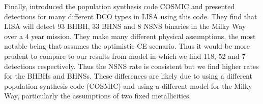 Finally, \citet{Breivik+2020} introduced the population synthesis code COSMIC and presented detections for many different DCO types in LISA using this code. They find that LISA will detect 93 BHBH, 33 BHNS and 8 NSNS binaries in the Milky Way over a 4 year mission. They make many different physical assumptions, the most notable being that \citet{Breivik+2020} assumes the optimistic CE scenario. Thus it would be more prudent to compare to our results from model \modOpt{} in which we find 118, 52 and 7 detections respectively. Thus the NSNS rate is consistent but we find higher rates for the BHBHs and BHNSs. These differences are likely due to using a different population synthesis code (COSMIC) and using a different model for the Milky Way, particularly the assumptions of two fixed metallicities.